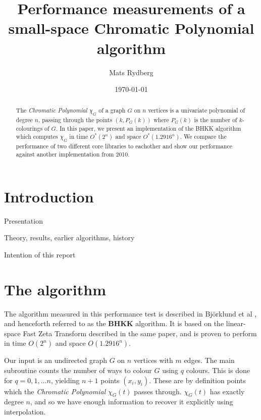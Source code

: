 \documentclass[a4paper]{article}
\title{\huge{Performance measurements of a small-space Chromatic Polynomial algorithm}}
\author{Mats Rydberg}
\date{\today}
\begin{document}
\maketitle

\begin{abstract}
 The \emph{Chromatic Polynomial} $\chi_G$ of a graph $G$ on $n$ vertices is a univariate polynomial of degree $n$, passing through the points $(k, P_G(k))$ where $P_G(k)$ is the number of $k$-colourings of $G$. In this paper, we present an implementation of the BHKK algorithm which computes $\chi_G$ in time $O^*(2^n)$ and space $O^*(1.2916^n)$. We compare the performance of two different core libraries to eachother and show our performance against another implementation from 2010.
\end{abstract}

\newpage

\section{Introduction}

Presentation

Theory, results, earlier algorithms, history

Intention of this report



\section{The algorithm}
The algorithm measured in this performance test is described in Björklund et al \cite{cov_pack}, and henceforth referred to as the \textbf{BHKK} algorithm. It is based on the linear-space Fast Zeta Transform described in the same paper, and is proven to perform in time $O(2^n)$ and space $O(1.2916^n)$. 


Our input is an undirected graph $G$ on $n$ vertices with $m$ edges\footnotemark. The main subroutine counts the number of ways to colour $G$ using $q$ colours. This is done for $q = 0, 1, \ldots n$, yielding $n + 1$ points $(x_i, y_i)$. These are by definition points which the \emph{Chromatic Polynomial} $\chi_G(t)$ passes through. $\chi_G(t)$ has exactly degree $n$, and so we have enough information to recover it explicitly using interpolation.
\end{document}
